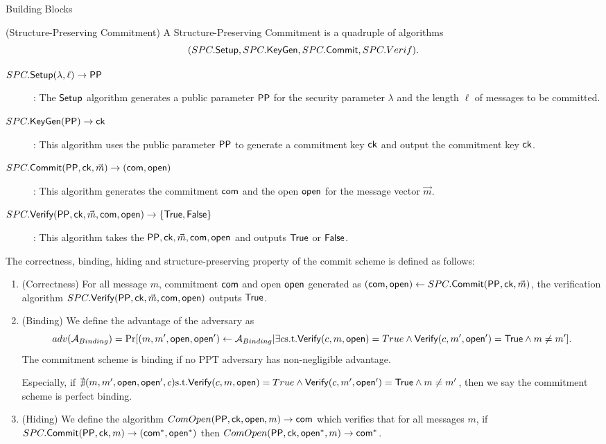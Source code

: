 \begin{subsection}{Building Blocks}
  \begin{myDef}{(Structure-Preserving Commitment)}
    A Structure-Preserving Commitment is a quadruple of algorithms
    $$(SPC.{\mathsf{Setup}}, SPC.{\mathsf{KeyGen}}, SPC.{\mathsf{Commit}}, SPC.Verif).$$
    \begin{description}
    \item[$\boldmath{SPC.{\mathsf{Setup}}(\lambda, \ell) \to \mathsf{PP}}$]: The ${\mathsf{Setup}}$ algorithm generates a public parameter $\mathsf{PP}$ for the security parameter $\lambda$ and the length $\ell$ of messages to be committed.
    \item[$\boldmath{SPC.{\mathsf{KeyGen}}(\mathsf{PP}) \to \mathsf{ck}}$]: This algorithm uses the public parameter $\mathsf{PP}$ to generate a commitment key $\mathsf{ck}$ and output the commitment key $\mathsf{ck}$.
    \item[$\boldmath{SPC.{\mathsf{Commit}}(\mathsf{PP}, \mathsf{ck}, \vec{m}) \to (\mathsf{com}, \mathsf{open})}$]: This algorithm generates the commitment $\mathsf{com}$ and the open $\mathsf{open}$ for the message vector $\vec{m}$.
    \item[$\boldmath{SPC.{\mathsf{Verify}}(\mathsf{PP},\mathsf{ck}, \vec{m}, \mathsf{com}, \mathsf{open}) \to \{\mathsf{True}, \mathsf{False}\}}$]:  This algorithm takes the $\mathsf{PP}, \mathsf{ck}, \vec{m}, \mathsf{com}, \mathsf{open}$ and outputs $\mathsf{True}$ or $\mathsf{False}$.
    \end{description}

    The correctness, binding, hiding and structure-preserving property of the commit scheme is defined as follows:
    \begin{enumerate}
    \item (Correctness) For all message $m$, commitment $\mathsf{com}$ and open $\mathsf{open}$ generated as $(\mathsf{com}, \mathsf{open}) \gets SPC.{\mathsf{Commit}}(\mathsf{PP}, \mathsf{ck}, \vec{m})$, the verification algorithm $SPC.{\mathsf{Verify}}(\mathsf{PP},\mathsf{ck}, \vec{m}, \mathsf{com}, \mathsf{open})$ outputs $\mathsf{True}$.

    \item(Binding) We define the advantage of the adversary as
      $$adv(\mathcal{A}_{Binding}) = \operatorname{Pr}[(m, m', \mathsf{open}, \mathsf{open}') \gets \mathcal{A}_{Binding}| \exists c \textrm{s.t.} {\mathsf{Verify}}(c,m, \mathsf{open}) = True \wedge {\mathsf{Verify}}(c, m', \mathsf{open}') = \mathsf{True} \wedge m \neq m'].$$
      The commitment scheme is binding if no PPT adversary has non-negligible advantage.

      Especially, if $\nexists (m, m', \mathsf{open}, \mathsf{open}', c) \textrm{s.t.} {\mathsf{Verify}}(c,m, \mathsf{open}) = True \wedge {\mathsf{Verify}}(c, m', \mathsf{open}') = \mathsf{True} \wedge m \neq m'$, then we say the commitment scheme is perfect binding.

    \item(Hiding) We define the algorithm $ComOpen(\mathsf{PP}, \mathsf{ck}, \mathsf{open}, m) \to \mathsf{com}$ which verifies that for all messages $m$, if $SPC.{\mathsf{Commit}}(\mathsf{PP}, \mathsf{ck}, m) \to (\mathsf{com}^*, \mathsf{open}^*)$ then $ComOpen(\mathsf{PP}, \mathsf{ck}, \mathsf{open}^*, m) \to \mathsf{com}^*$.


\end{enumerate}
\end{myDef}
\end{subsection}
